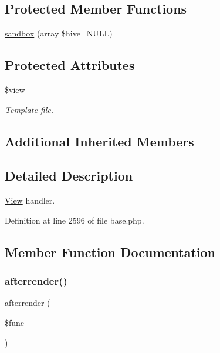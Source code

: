 \subsection*{Protected Member Functions}
\begin{DoxyCompactItemize}
\item 
\hyperlink{class_view_a2aae93402f5ee934a00733cc2bd9286a}{sandbox} (array \$hive=N\+U\+LL)
\end{DoxyCompactItemize}
\subsection*{Protected Attributes}
\begin{DoxyCompactItemize}
\item 
\hypertarget{class_view_acccf2eac8663e0cebe8101e90fbab089}{}\label{class_view_acccf2eac8663e0cebe8101e90fbab089} 
\hyperlink{class_view_acccf2eac8663e0cebe8101e90fbab089}{\$view}
\begin{DoxyCompactList}\small\item\em \hyperlink{class_template}{Template} file. \end{DoxyCompactList}\end{DoxyCompactItemize}
\subsection*{Additional Inherited Members}


\subsection{Detailed Description}
\hyperlink{class_view}{View} handler. 

Definition at line 2596 of file base.\+php.



\subsection{Member Function Documentation}
\hypertarget{class_view_a26528971a7a6dec321d8c96fc4e28d58}{}\label{class_view_a26528971a7a6dec321d8c96fc4e28d58} 
\subsubsection{\texorpdfstring{afterrender()}{afterrender()}}
{\footnotesize\ttfamily afterrender (\begin{DoxyParamCaption}\item[{}]{\$func }\end{DoxyParamCaption})}

